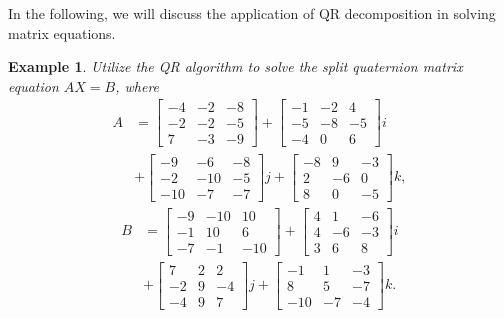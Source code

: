 \documentclass[12pt]{article}
\newtheorem{example}[theorem]{Example}
\begin{document}
In the following, we will discuss the application of QR decomposition in solving matrix equations.
\begin{example}
Utilize the QR algorithm to solve the split quaternion matrix equation $AX = B$, where
\begin{align*}
  A &=
    \begin{bmatrix}
    -4 & -2 & -8 \\
    -2 & -2 & -5 \\
     7 & -3 & -9
    \end{bmatrix} +
    \begin{bmatrix}
    -1 & -2 &  4 \\
    -5 & -8 & -5 \\
    -4 &  0 &  6
    \end{bmatrix} i \\
    &+ 
    \begin{bmatrix}
    -9  & -6  & -8 \\
    -2  & -10 & -5 \\
    -10 & -7  & -7
    \end{bmatrix} j +
    \begin{bmatrix}
    -8 &  9 & -3 \\
     2 & -6 &  0 \\
     8 &  0 & -5
    \end{bmatrix} k,
\end{align*}
\begin{align*}
  B &=
    \begin{bmatrix}
    -9 & -10 &  10 \\
    -1 &  10 &  6 \\
    -7 & -1  & -10
    \end{bmatrix} +
    \begin{bmatrix}
    4 &  1 & -6 \\
    4 & -6 & -3 \\
    3 &  6 &  8
    \end{bmatrix} i \\
    &+
    \begin{bmatrix}
     7 & 2 &  2 \\
    -2 & 9 & -4 \\
    -4 & 9 &  7
    \end{bmatrix} j +
    \begin{bmatrix}
    -1 &   1 & -3 \\
     8 &   5 & -7 \\
    -10 & -7 & -4
    \end{bmatrix} k.
\end{align*}
\end{example}  
\end{document}
